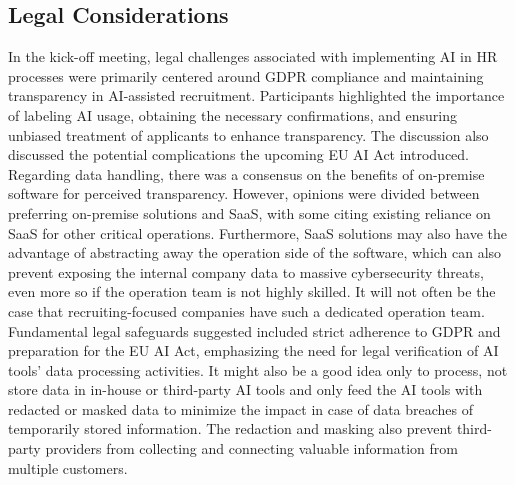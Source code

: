 \documentclass[draft,final]{thesisclass} %
\begin{document}
\subsection{Legal Considerations}
In the kick-off meeting, legal challenges associated with implementing \acs{AI} in \acs{HR} processes were primarily centered around \acs{GDPR} compliance and maintaining transparency in \acs{AI}-assisted recruitment. Participants highlighted the importance of labeling \acs{AI} usage, obtaining the necessary confirmations, and ensuring unbiased treatment of applicants to enhance transparency. The discussion also discussed the potential complications the upcoming \acs{EU AI Act} introduced. Regarding data handling, there was a consensus on the benefits of on-premise software for perceived transparency. However, opinions were divided between preferring on-premise solutions and \acs{SaaS}, with some citing existing reliance on \acs{SaaS} for other critical operations.
Furthermore, \acs{SaaS} solutions may also have the advantage of abstracting away the operation side of the software, which can also prevent exposing the internal company data to massive cybersecurity threats, even more so if the operation team is not highly skilled. It will not often be the case that recruiting-focused companies have such a dedicated operation team. Fundamental legal safeguards suggested included strict adherence to \acs{GDPR} and preparation for the \acs{EU AI Act}, emphasizing the need for legal verification of \acs{AI} tools' data processing activities. It might also be a good idea only to process, not store data in in-house or third-party \acs{AI} tools and only feed the \acs{AI} tools with redacted or masked data to minimize the impact in case of data breaches of temporarily stored information. The redaction and masking also prevent third-party providers from collecting and connecting valuable information from multiple customers.
\end{document}
